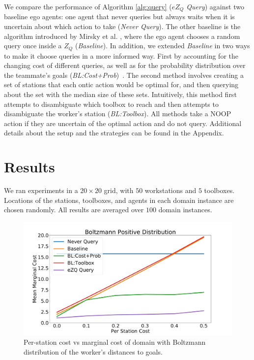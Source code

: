 \documentclass[letterpaper]{article}
\begin{document}
We compare the performance of Algorithm \ref{alg:query} (\emph{$eZ_Q$ Query}) against two baseline ego agents: one agent that never queries but always waits when it is uncertain about which action to take (\emph{Never Query}). The other baseline is the algorithm introduced by Mirsky et al. , where the ego agent chooses a random query once inside a $Z_Q$ (\emph{Baseline}). In addition, we extended \emph{Baseline} in two ways to make it choose queries in a more informed way. First by accounting for the changing cost of different queries, as well as for the probability distribution over the teammate's goals (\emph{BL:Cost+Prob})~\cite{MackeDMAP}. The second method involves creating a set of stations that each ontic action would be optimal for, and then querying about the set with the median size of these sets. Intuitively, this method first attempts to disambiguate which toolbox to reach and then attempts to disambiguate the worker's station  (\emph{BL:Toolbox}). All methods take a NOOP action if they are uncertain of the optimal action and do not query. Additional details about the setup and the strategies can be found in the Appendix.








\section{Results}
We ran experiments in a $20\times 20$ grid, with $50$ workstations and $5$ toolboxes. Locations of the stations, toolboxes, and agents in each domain instance are chosen randomly. All results are averaged over $100$ domain instances.



\begin{figure}[t]
\centering
\includegraphics[width=\linewidth]{Figures/CAT_AAAI_BoltzmannPositive.pdf}
\caption{Per-station cost vs marginal cost of domain with Boltzmann distribution of the worker's distances to goals.}
\label{fig:dist}
\end{figure}
\end{document}
